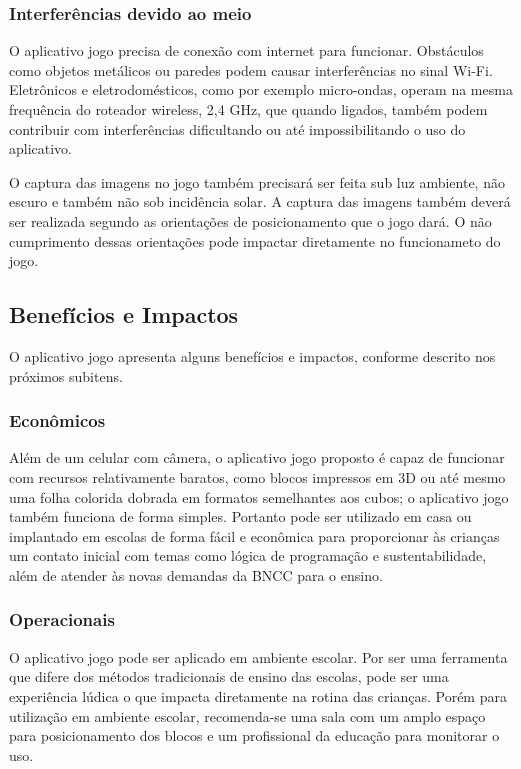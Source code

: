         \subsubsection{Interferências devido ao meio}
        O aplicativo jogo precisa de conexão com internet para funcionar. Obstáculos como objetos metálicos ou paredes podem causar interferências no sinal Wi-Fi. Eletrônicos e eletrodomésticos, como por exemplo micro-ondas, operam na mesma frequência do roteador wireless, 2,4 GHz, que quando ligados, também podem contribuir com interferências dificultando ou até impossibilitando o uso do aplicativo.
        
        O captura das imagens no jogo também precisará ser feita sub luz ambiente, não escuro e também não sob incidência solar. A captura das imagens também deverá ser realizada segundo as orientações de posicionamento que o jogo dará. O não cumprimento dessas orientações pode impactar diretamente no funcionameto do jogo.
    
    \subsection{Benefícios e Impactos}
    O aplicativo jogo apresenta alguns benefícios e impactos, conforme descrito nos próximos subitens.

        \subsubsection{Econômicos}
        Além de um celular com câmera, o aplicativo jogo proposto é capaz de funcionar com recursos relativamente baratos, como blocos impressos em 3D ou até mesmo uma folha colorida dobrada em formatos semelhantes aos cubos; o aplicativo jogo também funciona de forma simples. Portanto pode ser utilizado em casa ou implantado em escolas de forma fácil e econômica para proporcionar às crianças um contato inicial com temas como lógica de programação e sustentabilidade, além de atender às novas demandas da BNCC para o ensino.
        
        \subsubsection{Operacionais}
        O aplicativo jogo pode ser aplicado em ambiente escolar. Por ser uma ferramenta que difere dos métodos tradicionais de ensino das escolas, pode ser uma experiência lúdica o que impacta diretamente na rotina das crianças. Porém para utilização em ambiente escolar, recomenda-se uma sala com um amplo espaço para posicionamento dos blocos e um profissional da educação para monitorar o uso.
        
